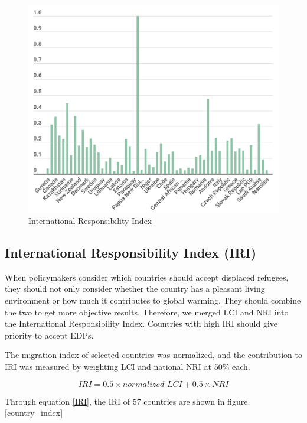 \documentclass[12pt]{article}  %
\begin{document}
\newpage
\begin{figure}[htbp]
	\centering
	\includegraphics[width=.8\textwidth]{NRI.png}
	\caption{ International Responsibility Index}\label{NRI}
\end{figure}










\subsection{International Responsibility Index (IRI)}

When policymakers consider which countries should accept displaced refugees, they should not only consider whether the country has a pleasant living environment or how much it contributes to global warming. They should combine the two to get more objective results. Therefore, we merged LCI and NRI into the International Responsibility Index. Countries with high IRI should give priority to accept EDPs.

The migration index of selected countries was normalized, and the contribution to IRI was measured by weighting LCI and national NRI at 50\% each.


\begin{equation}\label{IRI}
    IRI=0.5\times normalized\,\,LCI+0.5\times NRI
\end{equation}


Through equation \eqref{IRI}, the IRI of 57 countries are shown in figure. \ref{country_index}
\end{document}
